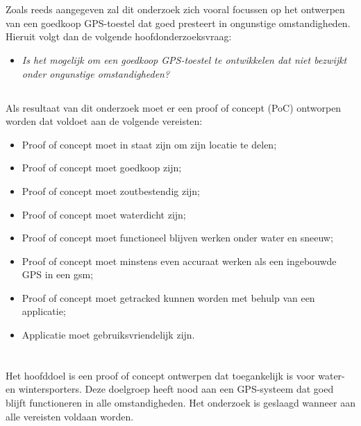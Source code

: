 \section{}
\subsection{}
\label{sec:onderzoeksvraag}

Zoals reeds aangegeven zal dit onderzoek zich vooral focussen op het ontwerpen van een goedkoop GPS-toestel dat goed presteert in ongunstige omstandigheden. Hieruit volgt dan de volgende hoofdonderzoeksvraag:
\newline
\begin{itemize}
	\item[] \textit{Is het mogelijk om een goedkoop GPS-toestel te ontwikkelen dat niet bezwijkt onder ongunstige omstandigheden?}
\end{itemize}

\subsection{}
Als resultaat van dit onderzoek moet er een proof of concept (PoC) ontworpen worden dat voldoet aan de volgende vereisten:
\begin{itemize}
	\item Proof of concept moet in staat zijn om zijn locatie te delen;
	\item Proof of concept moet goedkoop zijn;
	\item Proof of concept moet zoutbestendig zijn;
	\item Proof of concept moet waterdicht zijn;
    \item Proof of concept moet functioneel blijven werken  onder water en sneeuw;
	\item Proof of concept moet minstens even accuraat werken als een ingebouwde GPS in een gsm;
	\item Proof of concept moet getracked kunnen worden met behulp van een applicatie;
	\item Applicatie moet gebruiksvriendelijk zijn.
\end{itemize}

\section{}
\label{sec:onderzoeksdoelstelling}
Het hoofddoel is een proof of concept ontwerpen dat toegankelijk is voor water- en wintersporters. Deze doelgroep heeft nood aan een GPS-systeem dat goed blijft functioneren in alle omstandigheden. Het onderzoek is geslaagd wanneer aan alle vereisten voldaan worden.


